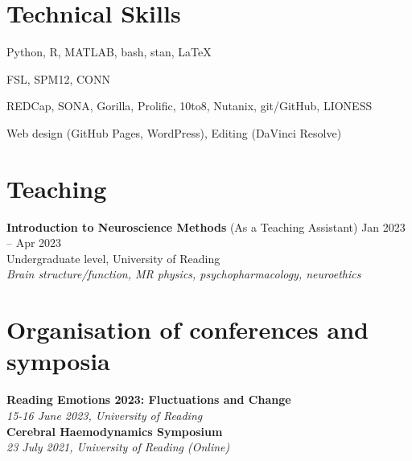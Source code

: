 \documentclass[a4paper,10pt]{article}
\begin{document}
\section{Technical Skills}
\vspace{2pt}
\begin{description}[left=0pt, font=\normalfont\bfseries]
  \item[Programming Languages:] Python, R, MATLAB, bash, stan, \LaTeX{}
  \item[Neuroimaging Software:] FSL, SPM12, CONN
  \item[Online Research Services:] REDCap, SONA, Gorilla, Prolific, 10to8, Nutanix, git/GitHub, LIONESS
  \item[Other:] Web design (GitHub Pages, WordPress), Editing (DaVinci Resolve)
\end{description}

\section{Teaching}
\vspace{2pt}
\textbf{Introduction to Neuroscience Methods} (As a Teaching Assistant) \hfill Jan 2023 -- Apr 2023 \\
Undergraduate level, University of Reading \\
\textit{Brain structure/function, MR physics, psychopharmacology, neuroethics} \\
\vspace{4pt} 

\section{Organisation of conferences and symposia}
\vspace{2pt}
\textbf{Reading Emotions 2023: Fluctuations and Change}  \\
\textit{15-16 June 2023, University of Reading} \\
\vspace{8pt} 
\textbf{Cerebral Haemodynamics Symposium}  \\
\textit{23 July 2021, University of Reading (Online)} \\
\vspace{4pt}

\end{document}
